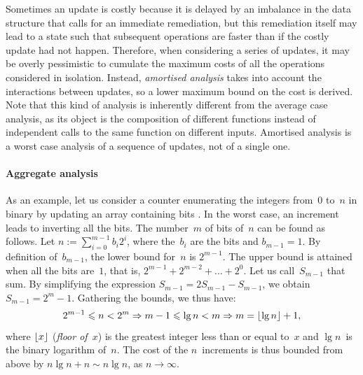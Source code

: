 \label{par:amortised_cost}

Sometimes an update is costly because it is delayed by an imbalance in
the data structure that calls for an immediate remediation, but this
remediation itself may lead to a state such that subsequent operations
are faster than if the costly update had not happen. Therefore, when
considering a series of updates, it may be overly pessimistic to
cumulate the maximum costs of all the operations considered in
isolation. Instead, \emph{amortised
  analysis} \citep{Okasaki_1998a} \citep[\S{}17]{CLRS_2009} takes into
account the interactions between updates, so a lower maximum bound on
the cost is derived. Note that this kind of analysis is inherently
different from the average case analysis, as its object is the
composition of different functions instead of independent calls to the
same function on different inputs. Amortised analysis is a worst case
analysis of a sequence of updates, not of a single one.


\paragraph{Aggregate analysis}
\label{par:aggregate}

As an example, let us consider a counter enumerating the integers
from~\(0\) to~\(n\) in binary by updating an array containing bits
\cite[\S{}17.1]{CLRS_2009}. In the worst case, an increment leads to
inverting all the bits. The number~\(m\) of bits of~\(n\) can be found
as follows. Let \(n := \sum_{i=0}^{m-1}{b_i2^i}\), where the~\(b_i\)
are the bits and \(b_{m-1}=1\). By definition of~\(b_{m-1}\), the
lower bound for~\(n\) is \(2^{m-1}\). The upper bound is attained when
all the bits are~\(1\), that is, \(2^{m-1} + 2^{m-2} + \ldots +
2^0\). Let us call~\(S_{m-1}\) that sum. By simplifying the expression
\(S_{m-1} = 2 S_{m-1} - S_{m-1}\), we obtain \(S_{m-1} = 2^m -
1\). Gathering the bounds, we thus have:
\begin{equation}
2^{m-1} \leqslant n < 2^m \Rightarrow m - 1 \leqslant \lg n
< m \Rightarrow m = \lfloor{\lg n}\rfloor + 1,
\label{eq:num_of_bits}
\end{equation}
where \(\lfloor{x}\rfloor\) (\textsl{floor
  of~\(x\)}) is the greatest integer less than or equal to~\(x\) and
\(\lg n\)~is the binary logarithm of~\(n\). The cost of the
\(n\)~increments is thus bounded from above by \(n\lg n + n \sim n\lg
n\), as \(n \rightarrow \infty\).

